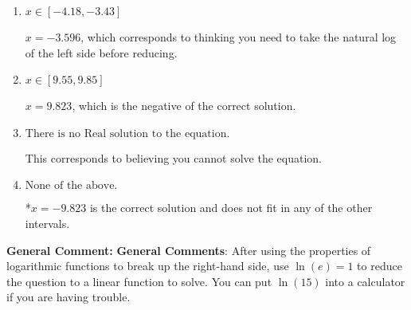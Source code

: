 \documentclass{extbook}[14pt]
\begin{document}
\begin{enumerate}
{\begin{enumerate}[label=\Alph*.]
$x = -2.823$, which corresponds to treating any root as a square root.
\item \( x \in [-4.18, -3.43] \)

$x = -3.596$, which corresponds to thinking you need to take the natural log of the left side before reducing.
\item \( x \in [9.55, 9.85] \)

$x = 9.823$, which is the negative of the correct solution.
\item \( \text{There is no Real solution to the equation.} \)

This corresponds to believing you cannot solve the equation.
\item \( \text{None of the above.} \)

*$x = -9.823$ is the correct solution and does not fit in any of the other intervals.
\end{enumerate}

\textbf{General Comment:} \textbf{General Comments}: After using the properties of logarithmic functions to break up the right-hand side, use $\ln(e) = 1$ to reduce the question to a linear function to solve. You can put $\ln(15)$ into a calculator if you are having trouble.
}
\end{enumerate}
\end{document}

